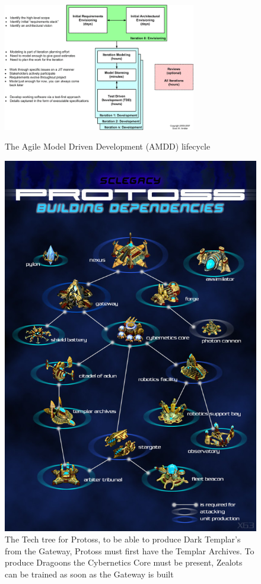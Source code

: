 \documentclass[journal]{IEEEtran}
\begin{document}
	\begin{figure}
		\centering
		\includegraphics[width=0.75\textwidth]{AMDD}
		\centering\caption{The Agile Model Driven Development (AMDD) lifecycle \cite{AMDD}}
		\label{Fig10}
		\centering
		\includegraphics[width= 0.5 \textwidth]{ProtossTechTree}
		\centering\caption{The Tech tree for Protoss, to be able to produce Dark Templar's from the Gateway, Protoss must first have the Templar Archives. To produce Dragoons the Cybernetics Core must be present, Zealots can be trained as soon as the Gateway is built \cite{Tech}}
		\label{Fig11}
	\end{figure}
\end{document}
